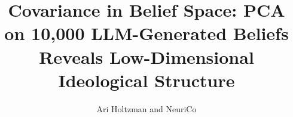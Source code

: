 \documentclass{article}
\title{Covariance in Belief Space: PCA on 10,000 LLM-Generated Beliefs Reveals Low-Dimensional Ideological Structure}
\author{Ari Holtzman and NeuriCo}
\begin{document}
\maketitle

\begin{abstract}

\end{abstract}










\end{document}
